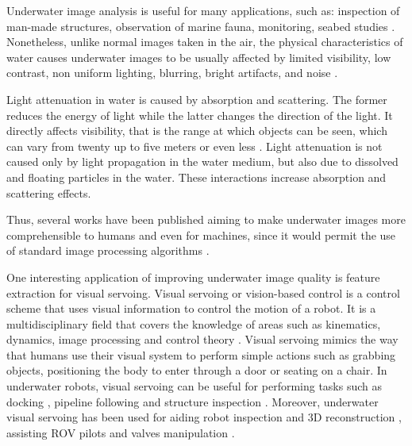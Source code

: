 \documentclass[conference, letterpaper]{IEEEtran}
\begin{document}
Underwater image analysis is useful for many applications, such as:
inspection of man-made structures, observation of marine fauna, monitoring,
seabed studies \cite{Aulinas2011}. Nonetheless, unlike normal images taken in
the air, the physical characteristics of water causes underwater
images to be usually affected by limited visibility, low contrast, non
uniform lighting, blurring, bright artifacts, and noise \cite{Yang2012}.

Light attenuation in water is caused by absorption and
scattering. The former reduces the energy of light while the latter changes the
direction of the light. It directly affects visibility, that is the range at
which objects can be seen, which can vary
from twenty up to five meters or even less \cite{Schettini2010}. Light
attenuation is not caused only by light propagation in the water medium, but
also due to dissolved and floating particles in the water. These
interactions increase absorption and scattering effects.

Thus, several works have been published aiming to make underwater images more
comprehensible to humans and even for machines, since it would permit the use
of standard image processing algorithms \cite{Schettini2010} \cite{sankpal2016nonuniform} \cite{rodrigues2016enhancement} \cite{bazeille2006automatic}
\cite{arnold2005preprocessing} \cite{chiang2012underwater} \cite{iqbal2007underwater}.

One interesting application of improving underwater image quality is
feature extraction for visual servoing. Visual servoing or vision-based
control is a control scheme that uses visual information to control the motion
of a robot. It is a multidisciplinary field that covers the knowledge of areas
such as kinematics, dynamics, image processing and control theory
\cite{Hutchinson1996}. Visual servoing mimics the way that humans use their
visual system to perform simple actions such as grabbing objects, positioning
the body to enter through a door or seating on a chair. In underwater robots,
visual servoing can be useful for performing tasks such as docking
\cite{Lee2003}, pipeline following \cite{Rives1997} and structure inspection
\cite{KRUPINSKI2015274}. Moreover, underwater visual servoing has been used
for aiding robot inspection and 3D reconstruction \cite{4302315}, assisting
ROV pilots \cite{4099090} and valves manipulation \cite{1282820}.
\end{document}

